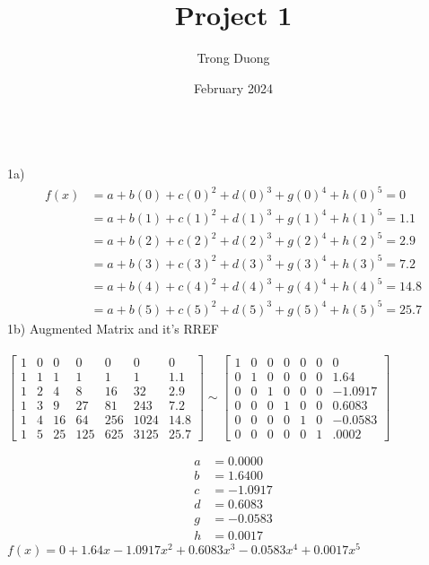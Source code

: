 \documentclass{article}
\title{Project 1}
\author{Trong Duong}
\date{February 2024}
\begin{document}
\maketitle

\\
1a)\\
\begin{align}
    f(x) & = a + b(0) + c(0)^2 + d(0)^3 + g(0)^4 + h(0)^5 = 0 \\
    & = a + b(1) + c(1)^2 + d(1)^3 + g(1)^4 + h(1)^5  = 1.1\\
    & = a + b(2) + c(2)^2 + d(2)^3 + g(2)^4 + h(2)^5  = 2.9 \\
    & = a + b(3) + c(3)^2 + d(3)^3 + g(3)^4 + h(3)^5  = 7.2 \\  
    & = a + b(4) + c(4)^2 + d(4)^3 + g(4)^4 + h(4)^5  = 14.8 \\  
    & = a + b(5) + c(5)^2 + d(5)^3 + g(5)^4 + h(5)^5  = 25.7
\end{align}
1b) Augmented Matrix and it's RREF \\
\\
$
\begin{bmatrix}
1 & 0 & 0 & 0 & 0 & 0 & 0 \\
1 & 1 & 1 & 1 & 1 & 1 & 1.1 \\
1 & 2 & 4 & 8 & 16 & 32 & 2.9 \\
1 & 3 & 9 & 27 & 81 & 243 & 7.2 \\
1 & 4 & 16 & 64 & 256 & 1024 & 14.8 \\
1 & 5 & 25 & 125 & 625 & 3125 & 25.7 
\end{bmatrix}  \sim
\begin{bmatrix}
1 & 0 & 0 & 0 & 0 & 0 & 0 \\
0 & 1 & 0 & 0 & 0 & 0 & 1.64 \\
0 & 0 & 1 & 0 & 0 & 0 & -1.0917 \\
0 & 0 & 0 & 1 & 0 & 0 & 0.6083 \\
0 & 0 & 0 & 0 & 1 & 0 & -0.0583 \\
0 & 0 & 0 & 0 & 0 & 1 & .0002 
\end{bmatrix}  
$

\begin{align*} 
    a &= 0.0000 \\
    b &= 1.6400 \\
    c &= -1.0917 \\ 
    d &= 0.6083  \\
    g &= -0.0583 \\
    h &= 0.0017  
\end{align*}
$f(x) = 0 + 1.64x - 1.0917x^2 + 0.6083x^3 - 0.0583x^4 + 0.0017x^5$ \\
\end{document}
